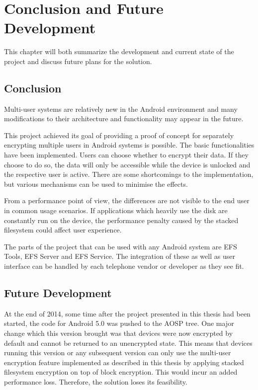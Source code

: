 \chapter{Conclusion and Future Development}
\label{chapter:conclusion-devel}

This chapter will both summarize the development and current state of the project and discuss future plans for the solution.

\section{Conclusion}
\label{sec:conclusion}

Multi-user systems are relatively new in the Android environment and many modifications to their architecture and functionality may appear in the future.

This project achieved its goal of providing a proof of concept for separately encrypting multiple users in Android systems is possible. The basic functionalities have been implemented. Users can choose whether to encrypt their data. If they choose to do so, the data will only be accessible while the device is unlocked and the respective user is active. There are some shortcomings to the implementation, but various mechanisms can be used to minimise the effects.

From a performance point of view, the differences are not visible to the end user in common usage scenarios. If applications which heavily use the disk are constantly run on the device, the performance penalty caused by the stacked filesystem could affect user experience.

The parts of the project that can be used with any Android system are EFS Tools, EFS Server and EFS Service. The integration of these as well as user interface can be handled by each telephone vendor or developer as they see fit.

\section{Future Development}
\label{sec:future-devel}

At the end of 2014, some time after the project presented in this thesis had been started, the code for Android 5.0 was pushed to the AOSP tree. One major change which this version brought was that devices were now encrypted by default and cannot be returned to an unencrypted state\cite{andr-enc}. This means that devices running this version or any subsequent version can only use the multi-user encryption feature implemented as described in this thesis by applying stacked filesystem encryption on top of block encryption. This would incur an added performance loss. Therefore, the solution loses its feasibility.

